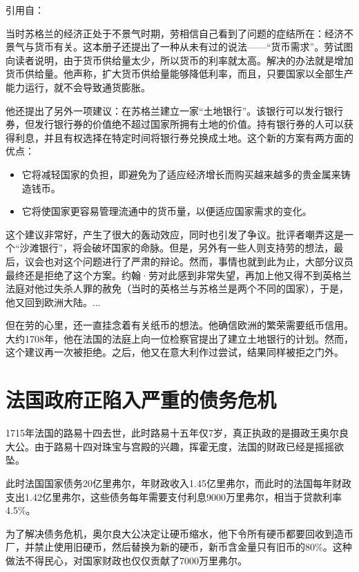 \documentclass[12pt,oneside]{book}
\begin{document}
引用自\cite{逃不开的经济周期}：
\begin{mdframed}
当时苏格兰的经济正处于不景气时期，劳相信自己看到了问题的症结所在：经济不景气与货币有关。这本册子还提出了一种从未有过的说法——“货币需求”。劳试图向读者说明，由于货币供给量太少，所以货币的利率就太高。解决的办法就是增加货币供给量。他声称，扩大货币供给量能够降低利率，而且，只要国家以全部生产能力运行，就不会导致通货膨胀。

他还提出了另外一项建议：在苏格兰建立一家“土地银行”。该银行可以发行银行券，但发行银行券的价值绝不超过国家所拥有土地的价值。持有银行券的人可以获得利息，并且有权选择在特定时间将银行券兑换成土地。这个新的方案有两方面的优点：

\begin{itemize}
\item 它将减轻国家的负担，即避免为了适应经济增长而购买越来越多的贵金属来铸造钱币。
\item 它将使国家更容易管理流通中的货币量，以便适应国家需求的变化。
\end{itemize}


这个建议非常好，产生了很大的轰动效应，同时也引发了争议。批评者嘲弄这是一个“沙滩银行”，将会破坏国家的命脉。但是，另外有一些人则支持劳的想法，最后，议会也对这个问题进行了严肃的辩论。然而，事情也就到此为止，大部分议员最终还是拒绝了这个方案。约翰·劳对此感到非常失望，再加上他又得不到英格兰法庭对他过失杀人罪的赦免（当时的英格兰与苏格兰是两个不同的国家），于是，他又回到欧洲大陆。...

但在劳的心里，还一直挂念着有关纸币的想法。他确信欧洲的繁荣需要纸币信用。大约1708年，他在法国的法庭上向一位检察官提出了建立土地银行的计划。然而，这个建议再一次被拒绝。之后，他又在意大利作过尝试，结果同样被拒之门外。
\end{mdframed}

\section{法国政府正陷入严重的债务危机}
1715年法国的路易十四去世，此时路易十五年仅7岁，真正执政的是摄政王奥尔良大公。由于路易十四对珠宝与宫殿的兴趣，挥霍无度，法国的财政已经是摇摇欲坠。

此时法国国家债务20亿里弗尔，年财政收入1.45亿里弗尔，而此时的法国每年财政支出1.42亿里弗尔，这些债务每年需要支付利息9000万里弗尔，相当于贷款利率4.5\%。

为了解决债务危机，奥尔良大公决定让硬币缩水，他下令所有硬币都要回收到造币厂，并禁止使用旧硬币，然后替换为新的硬币，新币含金量只有旧币的80\%。这种做法不得民心，对国家财政也仅仅贡献了7000万里弗尔。
\end{document}

